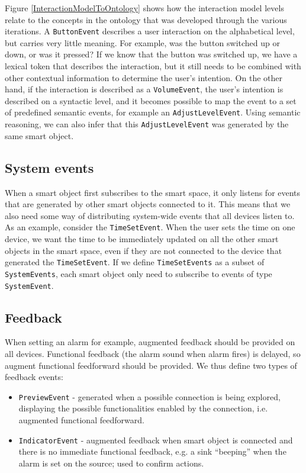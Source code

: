 Figure \ref{InteractionModelToOntology} shows how the interaction model levels relate to the concepts in the ontology that was developed through the various iterations. A \texttt{ButtonEvent} describes a user interaction on the alphabetical level, but carries very little meaning. For example, was the button switched up or down, or was it pressed? If we know that the button was switched up, we have a lexical token that describes the interaction, but it still needs to be combined with other contextual information to determine the user's intention. On the other hand, if the interaction is described as a \texttt{VolumeEvent}, the user's intention is described on a syntactic level, and it becomes possible to map the event to a set of predefined semantic events, for example an \texttt{AdjustLevelEvent}. Using semantic reasoning, we can also infer that this \texttt{AdjustLevelEvent} was generated by the same smart object.




\subsection{System events}
\label{SystemEvents}
When a smart object first subscribes to the smart space, it only listens for events that are generated by other smart objects connected to it. This means that we also need some way of distributing system-wide events that all devices listen to. As an example, consider the \texttt{TimeSetEvent}. When the user sets the time on one device, we want the time to be immediately updated on all the other smart objects in the smart space, even if they are not connected to the device that generated the \texttt{TimeSetEvent}. If we define \texttt{TimeSetEvents} as a subset of \texttt{SystemEvents}, each smart object only need to subscribe to events of type \texttt{SystemEvent}.


\subsection{Feedback}
When setting an alarm for example, augmented feedback should be provided on all devices. Functional feedback (the alarm sound when alarm fires) is delayed, so augment functional feedforward should be provided. We thus define two types of feedback events:

\begin{itemize}
\item \texttt{PreviewEvent} - generated when a possible connection is being explored, displaying the possible functionalities enabled by the connection, i.e. augmented functional feedforward.
\item \texttt{IndicatorEvent} - augmented feedback when smart object is connected and there is no immediate functional feedback, e.g. a sink ``beeping'' when the alarm is set on the source; used to confirm actions.   
\end{itemize} 


